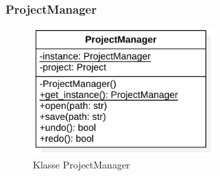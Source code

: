 \documentclass{article}
\begin{document}
\newpage
\subsubsection*{\large{\textbf{ProjectManager}\label{cls:ProjectManager}}}\normalsize

\begin{figure}[H]%
    \centering
    \includegraphics[width=7cm]{entwurf/Floriane/ProjectManager.png}
    \caption{Klasse ProjectManager}
\end{figure}
\end{document}
